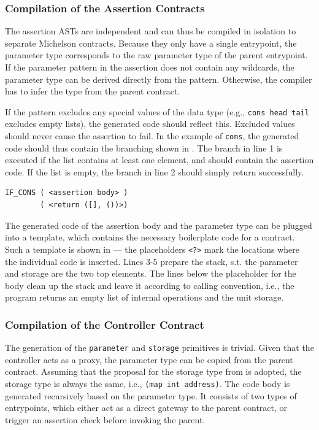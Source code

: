 \subsubsection{Compilation of the Assertion Contracts}
The assertion ASTs are independent and can thus be compiled in isolation to separate Michelson contracts. Because they only have a single entrypoint, the parameter type corresponds to the raw parameter type of the parent entrypoint. If the parameter pattern in the assertion does not contain any wildcards, the parameter type can be derived directly from the pattern. Otherwise, the compiler has to infer the type from the parent contract.

If the pattern excludes any special values of the data type (e.g., \texttt{cons head tail} excludes empty lists), the generated code should reflect this. Excluded values should never cause the assertion to fail. In the example of \texttt{cons}, the generated code should thus contain the branching shown in . The branch in line 1 is executed if the list contains at least one element, and should contain the assertion code. If the list is empty, the branch in line 2 should simply return successfully. 
\begin{lstlisting}[language=Michelson, label=lst:cons, caption=Exclusion of empty lists in the assertion]
IF_CONS ( <assertion body> )
        ( <return ([], ())>)
\end{lstlisting}

The generated code of the assertion body and the parameter type can be plugged into a template, which contains the necessary boilerplate code for a contract. Such a template is shown in  --- the placeholders \texttt{<?>} mark the locations where the individual code is inserted. Lines 3-5 prepare the stack, s.t. the parameter and storage are the two top elements. The lines below the placeholder for the body clean up the stack and leave it according to calling convention, i.e., the program returns an empty list of internal operations and the unit storage.


\subsubsection{Compilation of the Controller Contract}
The generation of the \texttt{parameter} and \texttt{storage} primitives is trivial. Given that the controller acts as a proxy, the parameter type can be copied from the parent contract. Assuming that the proposal for the storage type from  is adopted, the storage type is always the same, i.e., \texttt{(map int address)}. The code body is generated recursively based on the parameter type. It consists of two types of entrypoints, which either act as a direct gateway to the parent contract, or trigger an assertion check before invoking the parent.

